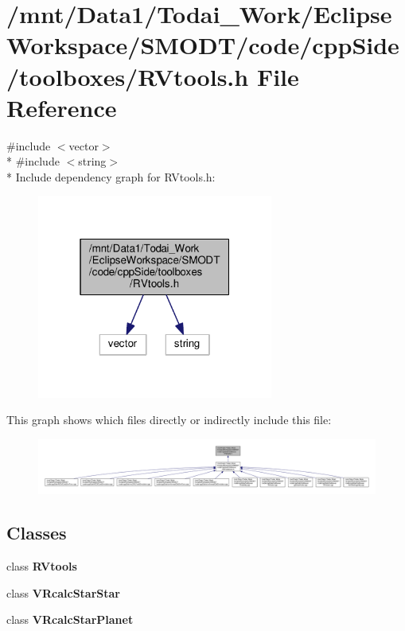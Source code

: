 \section{/mnt/\-Data1/\-Todai\-\_\-\-Work/\-Eclipse\-Workspace/\-S\-M\-O\-D\-T/code/cpp\-Side/toolboxes/\-R\-Vtools.h File Reference}
\label{_r_vtools_8h}
{\ttfamily \#include $<$vector$>$}\\*
{\ttfamily \#include $<$string$>$}\\*
Include dependency graph for R\-Vtools.\-h\-:
\nopagebreak
\begin{figure}[H]
\begin{center}
\leavevmode
\includegraphics[width=220pt]{_r_vtools_8h__incl}
\end{center}
\end{figure}
This graph shows which files directly or indirectly include this file\-:
\nopagebreak
\begin{figure}[H]
\begin{center}
\leavevmode
\includegraphics[width=350pt]{_r_vtools_8h__dep__incl}
\end{center}
\end{figure}
\subsection*{Classes}
\begin{DoxyCompactItemize}
\item 
class {\bf R\-Vtools}
\item 
class {\bf V\-Rcalc\-Star\-Star}
\item 
class {\bf V\-Rcalc\-Star\-Planet}
\end{DoxyCompactItemize}
